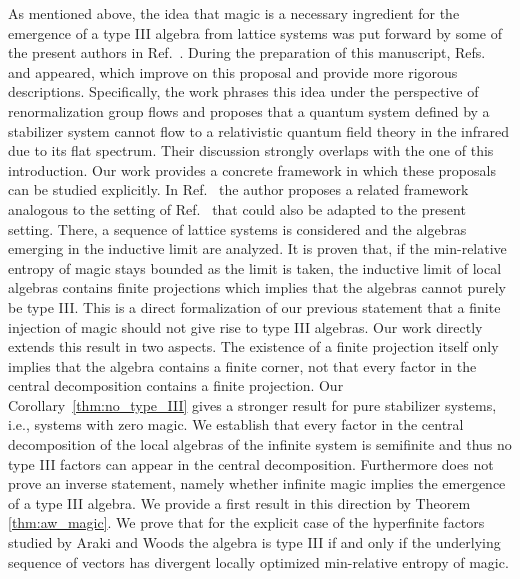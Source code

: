 \documentclass[aps,pra,reprint,superscriptaddress]{revtex4-2}
\theoremstyle{definition}
\theoremstyle{remark}
\begin{document}
As mentioned above, the idea that magic is a necessary ingredient for the emergence of a type III algebra from lattice systems was put forward by some of the present authors in Ref.~\cite{Chemissany:2025vye}. During the preparation of this manuscript, Refs. \cite{Benedetti:2026mfy} and \cite{Moosa:2026nqz} appeared, which improve on this proposal and provide more rigorous descriptions. Specifically, the work \cite{Benedetti:2026mfy} phrases this idea under the perspective of renormalization group flows
and proposes that a quantum system defined by a stabilizer system cannot flow to a relativistic quantum field theory in the infrared due to its flat spectrum. Their discussion strongly overlaps with the one of this introduction.
Our work provides a concrete framework in which these proposals can be studied explicitly.
In Ref.~\cite{Moosa:2026nqz} the author proposes a related framework analogous to the setting of Ref.~\cite{Chemissany:2025vye} that could also be adapted to the present setting. There, a sequence 
of lattice systems is considered and the algebras emerging in the inductive limit are analyzed. It is proven that, if the min-relative entropy of magic stays bounded as the limit is taken, the inductive limit of local algebras contains finite projections which implies that the algebras cannot purely be type III. This is a direct formalization of our previous statement that a finite injection of magic should not give rise to type III algebras.
Our work directly extends this result in two aspects.
The existence of a finite projection itself only implies that the algebra contains a finite corner, not that every factor in the central decomposition contains a finite projection. Our Corollary~\ref{thm:no_type_III} gives a stronger result for pure stabilizer systems, i.e., systems with zero magic. We establish that every factor in the central decomposition of the local algebras of the infinite system is semifinite and thus no type III factors can appear in the central decomposition. Furthermore \cite{Moosa:2026nqz} does not prove an inverse statement, namely whether infinite magic implies the emergence of a type III algebra. We provide a first result in this direction by Theorem \ref{thm:aw_magic}. We prove that for the explicit case of the hyperfinite factors studied by Araki and Woods \cite{ArakiWoods1968} the algebra is type III if and only if the underlying sequence of vectors has divergent locally optimized min-relative entropy of magic.

\end{document}
